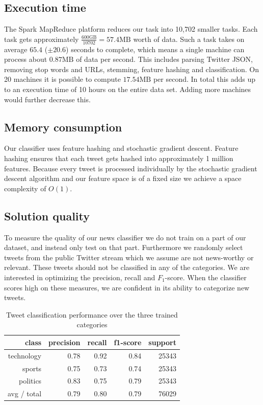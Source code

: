 \documentclass{llncs}
\begin{document}
\subsection{Execution time}
The Spark MapReduce platform reduces our task into 10,702 smaller tasks. Each task gets approximately $\frac{600\text{GB}}{10702} = 57.4\text{MB}$ worth of data. Such a task takes on average $65.4$ ($\pm 20.6$) seconds to complete, which means a single machine can process about $0.87\text{MB}$ of data per second. This includes parsing Twitter JSON, removing stop words and URLs, stemming, feature hashing and classification. On 20 machines it is possible to compute $17.54\text{MB}$ per second. In total this adds up to an execution time of 10 hours on the entire data set. Adding more machines would further decrease this.

\subsection{Memory consumption}
Our classifier uses feature hashing and stochastic gradient descent. Feature hashing ensures that each tweet gets hashed into approximately 1 million features. Because every tweet is processed individually by the stochastic gradient descent algorithm and our feature space is of a fixed size we achieve a space complexity of $O(1)$.

\subsection{Solution quality}
To measure the quality of our news classifier we do not train on a part of our dataset, and instead only test on that part. Furthermore we randomly select tweets from the public Twitter stream which we assume are not news-worthy or relevant. These tweets should not be classified in any of the categories. We are interested in optimizing the precision, recall and $F_1$-score. When the classifier scores high on these measures, we are confident in its ability to categorize new tweets.

\begin{table}
	\begin{center}
		\begin{tabular}{|r|r|r|r|r|} \hline
			class  & precision   & recall & f1-score  & support \\ \hline
			technology    &   0.78 &     0.92  &    0.84   &  25343 \\
			sports   &    0.75   &   0.73   &   0.74   &   25343 \\
			politics   &    0.83  &    0.75   &   0.79   &   25343 \\
			avg / total  &     0.79   &   0.80  &    0.79   &  76029 \\ \hline
		\end{tabular}
	\end{center}
	\caption{Tweet classification performance over the three trained categories}
	\label{tbl:newclassifier}
\end{table}
\end{document}
